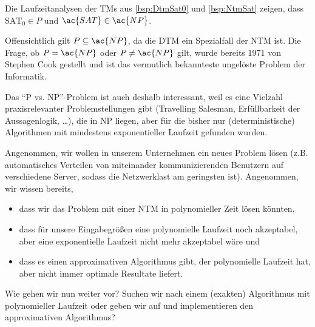 \begin{Bemerkung}
 Die Laufzeitanalysen der \ac{TM}s aus \autoref{bsp:DtmSat0} und \autoref{bsp:NtmSat} zeigen, dass $\text{SAT}_0\in P$ und $\ac{SAT}\in \ac{NP}$.
\end{Bemerkung}


Offensichtlich gilt $P\subseteq \ac{NP}$, da die \ac{DTM} ein Spezialfall der \ac{NTM} ist.
Die Frage, ob $P=\ac{NP}$ oder $P\neq \ac{NP}$ gilt, wurde bereits 1971 von Stephen Cook gestellt und ist das vermutlich bekannteste ungelöste Problem der Informatik.

Das "`\ac{P} vs. \ac{NP}"'-Problem ist auch deshalb interessant, weil es eine Vielzahl praxisrelevanter Problemstellungen gibt (Travelling Salesman, Erfüllbarkeit der Aussagenlogik, \dots),
die in \ac{NP} liegen, aber für die bisher nur (deterministische) Algorithmen mit mindestens exponentieller Laufzeit gefunden wurden.

Angenommen, wir wollen in unserem Unternehmen ein neues Problem lösen
(z.B. automatisches Verteilen von miteinander kommunizierenden Benutzern auf verschiedene Server, sodass die Netzwerklast am geringsten ist).
Angenommen, wir wissen bereits,
\begin{itemize}
 \item dass wir das Problem mit einer \ac{NTM} in polynomieller Zeit lösen könnten,
 \item dass für unsere Eingabegrößen eine polynomielle Laufzeit noch akzeptabel, aber eine exponentielle Laufzeit nicht mehr akzeptabel wäre und
 \item dass es einen approximativen Algorithmus gibt, der polynomielle Laufzeit hat, aber nicht immer optimale Resultate liefert.
\end{itemize}
Wie gehen wir nun weiter vor? Suchen wir nach einem (exakten) Algorithmus mit polynomieller Laufzeit oder geben wir auf und implementieren den approximativen Algorithmus?

